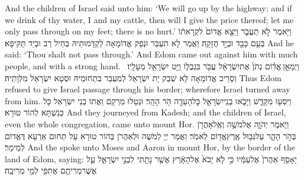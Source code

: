 {And the children of Israel said unto him: ‘We will go up by the highway; and if we drink of thy water, I and my cattle, then will I give the price thereof; let me only pass through on my feet; there is no hurt.’}{}
{וַיֹּ֖אמֶר לֹ֣א תַעֲבֹ֑ר וַיֵּצֵ֤א אֱדוֹם֙ לִקְרָאת֔וֹ בְּעַ֥ם כָּבֵ֖ד וּבְיָ֥ד חֲזָקָֽה׃}
{וַאֲמַר לָא תִעְבַּר וּנְפַק אֱדוֹמָאָה לְקַדָּמוּתֵיהּ בְּחֵיל רַב וּבְיַד תַּקִּיפָא׃}
{And he said: ‘Thou shalt not pass through.’ And Edom came out against him with much people, and with a strong hand.}{}
{וַיְמָאֵ֣ן \legarmeh  אֱד֗וֹם נְתֹן֙ אֶת\maqqaf יִשְׂרָאֵ֔ל עֲבֹ֖ר בִּגְבֻל֑וֹ וַיֵּ֥ט יִשְׂרָאֵ֖ל מֵעָלָֽיו׃ \petucha }
{וְסָרֵיב אֱדוֹמָאָה לָא שְׁבַק יָת יִשְׂרָאֵל לְמִעְבַּר בִּתְחוּמֵיהּ וּסְטָא יִשְׂרָאֵל מִלְּוָתֵיהּ׃}
{Thus Edom refused to give Israel passage through his border; wherefore Israel turned away from him.}{}
{וַיִּסְע֖וּ מִקָּדֵ֑שׁ וַיָּבֹ֧אוּ בְנֵֽי\maqqaf יִשְׂרָאֵ֛ל כׇּל\maqqaf הָעֵדָ֖ה הֹ֥ר הָהָֽר׃}
{וּנְטַלוּ מֵרְקַם וַאֲתוֹ בְנֵי יִשְׂרָאֵל כָּל כְּנִשְׁתָּא לְהוֹר טוּרָא׃}
{And they journeyed from Kadesh; and the children of Israel, even the whole congregation, came unto mount Hor.}{}
{וַיֹּ֧אמֶר יְהֹוָ֛ה אֶל\maqqaf מֹשֶׁ֥ה וְאֶֽל\maqqaf אַהֲרֹ֖ן בְּהֹ֣ר הָהָ֑ר עַל\maqqaf גְּב֥וּל אֶֽרֶץ\maqqaf אֱד֖וֹם לֵאמֹֽר׃}
{וַאֲמַר יְיָ לְמֹשֶׁה וּלְאַהֲרֹן בְּהוֹר טוּרָא עַל תְּחוּם אַרְעָא דֶּאֱדוֹם לְמֵימַר׃}
{And the \lord\space spoke unto Moses and Aaron in mount Hor, by the border of the land of Edom, saying:}{}
{יֵאָסֵ֤ף אַהֲרֹן֙ אֶל\maqqaf עַמָּ֔יו כִּ֣י לֹ֤א יָבֹא֙ אֶל\maqqaf הָאָ֔רֶץ אֲשֶׁ֥ר נָתַ֖תִּי לִבְנֵ֣י יִשְׂרָאֵ֑ל עַ֛ל אֲשֶׁר\maqqaf מְרִיתֶ֥ם אֶת\maqqaf פִּ֖י לְמֵ֥י מְרִיבָֽה׃}
